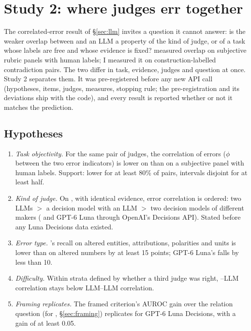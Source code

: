 \section{Study 2: where judges err together}
\label{sec:study2}

The correlated-error result of \S\ref{sec:llm} invites a question it cannot answer: is the weaker overlap between \jev{} and an LLM a property of the kind of judge, or of a task whose labels are free and whose evidence is fixed? \citet{rao2026jev} measured overlap on subjective rubric panels with human labels; I measured it on construction-labelled contradiction pairs. The two differ in task, evidence, judges and question at once. Study 2 separates them. It was pre-registered before any new API call (hypotheses, items, judges, measures, stopping rule; the pre-registration and its deviations ship with the code), and every result is reported whether or not it matches the prediction.

\subsection{Hypotheses}

\begin{enumerate}[nosep,leftmargin=1.6em]
\item[H1] \emph{Task objectivity.} For the same pair of judges, the correlation of errors ($\phi$ between the two error indicators) is lower on \dc{} than on a subjective panel with human labels. Support: lower for at least 80\% of pairs, intervals disjoint for at least half.
\item[H2] \emph{Kind of judge.} On \dc{}, with identical evidence, error correlation is ordered: two LLMs $>$ a decision model with an LLM $>$ two decision models of different makers (\jev{} and GPT-6 Luna through OpenAI's Decisions API). Stated before any Luna Decisions data existed.
\item[H3] \emph{Error type.} \jev{}'s recall on altered entities, attributions, polarities and units is lower than on altered numbers by at least 15 points; GPT-6 Luna's falls by less than 10.
\item[H4] \emph{Difficulty.} Within strata defined by whether a third judge was right, \jev{}--LLM correlation stays below LLM--LLM correlation.
\item[H5] \emph{Framing replicates.} The framed criterion's AUROC gain over the relation question (for \jev{}, \S\ref{sec:framing}) replicates for GPT-6 Luna Decisions, with a gain of at least 0.05.
\end{enumerate}

